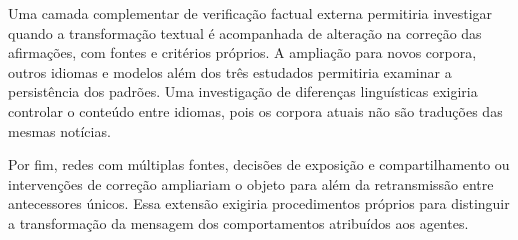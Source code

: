 Uma camada complementar de verificação factual externa permitiria investigar quando a transformação textual é acompanhada de alteração na correção das afirmações, com fontes e critérios próprios. A ampliação para novos corpora, outros idiomas e modelos além dos três estudados permitiria examinar a persistência dos padrões. Uma investigação de diferenças linguísticas exigiria controlar o conteúdo entre idiomas, pois os corpora atuais não são traduções das mesmas notícias.

Por fim, redes com múltiplas fontes, decisões de exposição e compartilhamento ou intervenções de correção ampliariam o objeto para além da retransmissão entre antecessores únicos. Essa extensão exigiria procedimentos próprios para distinguir a transformação da mensagem dos comportamentos atribuídos aos agentes.
